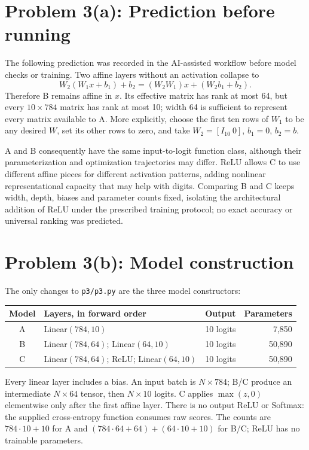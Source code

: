 \documentclass[11pt,a4paper]{article}
\begin{document}
\clearpage
\section*{Problem 3(a): Prediction before running}
The following prediction was recorded in the AI-assisted workflow before model checks or training. Two affine layers without an activation collapse to
\[
W_2(W_1x+b_1)+b_2=(W_2W_1)x+(W_2b_1+b_2).
\]
Therefore B remains affine in $x$. Its effective matrix has rank at most 64, but every $10\times784$ matrix has rank at most 10; width 64 is sufficient to represent every matrix available to A. More explicitly, choose the first ten rows of $W_1$ to be any desired $W$, set its other rows to zero, and take $W_2=[I_{10}\ 0]$, $b_1=0$, $b_2=b$.

A and B consequently have the same input-to-logit function class, although their parameterization and optimization trajectories may differ. ReLU allows C to use different affine pieces for different activation patterns, adding nonlinear representational capacity that may help with digits. Comparing B and C keeps width, depth, biases and parameter counts fixed, isolating the architectural addition of ReLU under the prescribed training protocol; no exact accuracy or universal ranking was predicted.

\section*{Problem 3(b): Model construction}
The only changes to \texttt{p3/p3.py} are the three model constructors:
\begin{center}
\small
\begin{tabular}{clrr}
\toprule
Model & Layers, in forward order & Output & Parameters\\
\midrule
A & Linear$(784,10)$ & 10 logits & 7,850\\
B & Linear$(784,64)$; Linear$(64,10)$ & 10 logits & 50,890\\
C & Linear$(784,64)$; ReLU; Linear$(64,10)$ & 10 logits & 50,890\\
\bottomrule
\end{tabular}
\end{center}
Every linear layer includes a bias. An input batch is $N\times784$; B/C produce an intermediate $N\times64$ tensor, then $N\times10$ logits. C applies $\max(z,0)$ elementwise only after the first affine layer. There is no output ReLU or Softmax: the supplied cross-entropy function consumes raw scores. The counts are $784\cdot10+10$ for A and $(784\cdot64+64)+(64\cdot10+10)$ for B/C; ReLU has no trainable parameters.
\end{document}

